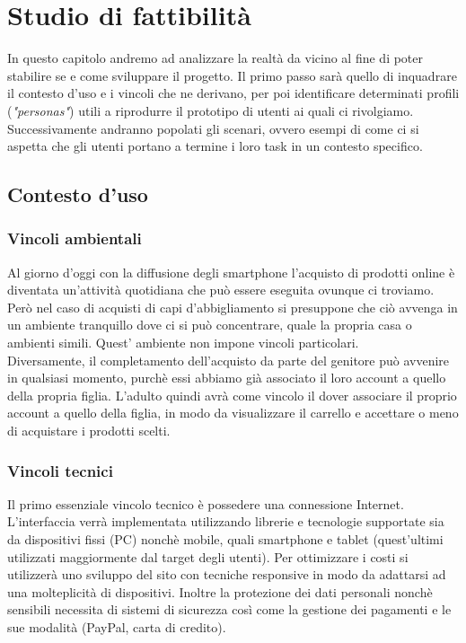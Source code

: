 \documentclass[12pt,a4paper]{report}
\begin{document}
\chapter{Studio di fattibilità}
In questo capitolo andremo ad analizzare la realtà da vicino al fine di poter stabilire se e come sviluppare il progetto. Il primo passo sarà quello di inquadrare il contesto d'uso e i vincoli che ne derivano, per poi identificare determinati profili (\textit{"personas"}) utili a riprodurre il prototipo di utenti ai quali ci rivolgiamo. Successivamente andranno popolati gli scenari, ovvero esempi di come ci si aspetta che gli utenti portano a termine i loro task in un contesto specifico.
\section{Contesto d'uso}
\subsection{Vincoli ambientali}
Al giorno d'oggi con la diffusione degli smartphone l'acquisto di prodotti online è diventata un'attività quotidiana che può essere eseguita ovunque ci troviamo. Però nel caso di acquisti di capi d'abbigliamento si presuppone che ciò avvenga in un ambiente tranquillo dove ci si può concentrare, quale la propria casa o ambienti simili. Quest' ambiente non impone vincoli particolari.\\
Diversamente, il completamento dell'acquisto da parte del genitore può avvenire in qualsiasi momento, purchè essi abbiamo già associato il loro account a quello della propria figlia. L'adulto quindi avrà come vincolo il dover associare il proprio account a quello della figlia, in modo da visualizzare il carrello e accettare o meno di acquistare i prodotti scelti.
\subsection{Vincoli tecnici}
Il primo essenziale vincolo tecnico è possedere una connessione Internet. L'interfaccia verrà implementata utilizzando librerie e tecnologie supportate sia da dispositivi fissi (PC) nonchè mobile, quali smartphone e tablet (quest'ultimi utilizzati maggiormente dal target degli utenti). Per ottimizzare i costi si utilizzerà uno sviluppo del sito con tecniche responsive in modo da adattarsi ad una molteplicità di dispositivi. Inoltre la protezione dei dati personali nonchè sensibili necessita di sistemi di sicurezza così come la gestione dei pagamenti e le sue modalità (PayPal, carta di credito).
\end{document}

